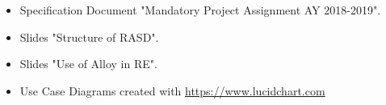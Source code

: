 \begin{itemize}

\item Specification Document "Mandatory Project Assignment AY 2018-2019".

\item Slides "Structure of RASD".

\item Slides "Use of Alloy in RE".

\item Use Case Diagrams created with \url{https://www.lucidchart.com}

\end{itemize}